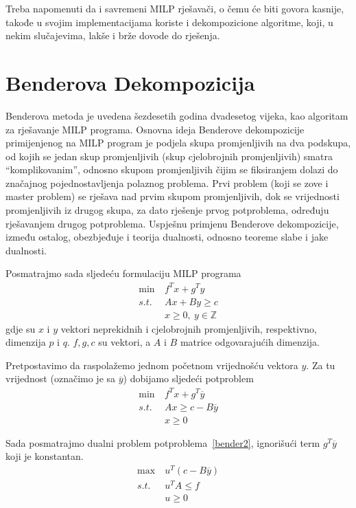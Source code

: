 \documentclass[a4paper, utf8, 11pt, colorlinks]{book}
\begin{document}
Treba napomenuti da i savremeni MILP rješavači, o čemu će biti govora kasnije, takođe u svojim implementacijama koriste i dekompozicione algoritme, koji, u nekim slučajevima, lakše i brže dovode do rješenja.
 
 
 \section{Benderova Dekompozicija}
 
 Benderova metoda je uvedena šezdesetih godina dvadesetog vijeka, kao algoritam za rješavanje MILP programa. 
 Osnovna ideja Benderove dekompozicije primijenjenog na MILP program je podjela skupa promjenljivih na dva podskupa, od kojih se jedan skup promjenljivih (skup cjelobrojnih promjenljivih) smatra ``komplikovanim'', odnosno skupom promjenljivih čijim se fiksiranjem dolazi do značajnog pojednostavljenja polaznog problema. Prvi problem (koji se zove i master problem) se rješava nad prvim skupom promjenljivih, dok se vrijednosti promjenljivih iz drugog skupa,  za dato rješenje prvog potproblema, određuju rješavanjem drugog potproblema. Uspješnu primjenu Benderove dekompozicije, između ostalog, obezbjeđuje i teorija dualnosti, odnosno teoreme slabe i jake dualnosti.
 

 Posmatrajmo sada sljedeću formulaciju MILP programa
 \begin{equation}
 \begin{aligned}\label{bender1}
 \min\  &f^Tx+g^Ty\\
 s.t.\  &Ax+By\geqslant c\\
 &x\geqslant 0,\ y \in \mathbb{Z}
 \end{aligned}
\end{equation}
 gdje su $x$ i $y$ vektori neprekidnih i cjelobrojnih promjenljivih, respektivno, dimenzija $p$ i $q$. $f,g,c$ su vektori, a $A$ i $B$ matrice odgovarajućih dimenzija. 
 
 Pretpostavimo da raspolažemo jednom početnom vrijednošću vektora $y$. Za tu vrijednost (označimo je sa $\overline{y}$) dobijamo sljedeći potproblem
  \begin{equation}
 	\begin{aligned}\label{bender2}
\min\ &  f^Tx+g^T\overline{y}\\
  s.t.\ & Ax\geqslant c-B\overline{y}\\
 &x\geqslant 0
  \end{aligned}
\end{equation}
 
Sada posmatrajmo dualni problem potproblema~\ref{bender2}, ignorišući term $g^T\overline{y}$ koji je konstantan.
  \begin{equation}
	\begin{aligned}\label{bender3}
	\max\ &u^T (c-B\overline{y})\\
	s.t.\ &u^TA\leqslant f\\
	&u\geqslant 0
  \end{aligned}
\end{equation}
\end{document}
